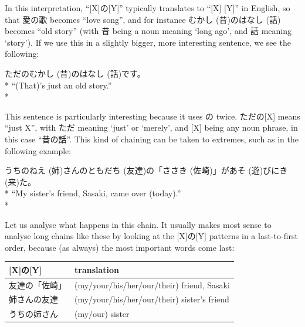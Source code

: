 \documentclass[11pt, b5paper, twoside, openright, onecolumn]{book}
\makeatletter
\newcommand*{\rubystack}[2]{{\relscale{0.5}%
  \begin{tabular}[b]{@{}c@{}}%
    {#1}\\%
   {\textscale{2}{#2}}%
  \end{tabular}}%
}
\DeclareRobustCommand*{\ruby}[2]{%
  \mbox{%
    \setlength{\parskip}{0ex}%
    \BeginAccSupp{method=pdfstringdef,ActualText={#1}}%
      \rubystack{\phantom{#2}}{#1}%
      \llap{%
        \rubystack{#2}{\phantom{#1}}%
      }%
    \EndAccSupp{}%
  }%
}
\renewcommand*{\ruby}[2]{#2 (#1)}%
\newenvironment{exampleblock}{
\setlength{\parindent}{0.6in}
\begin{minipage}[t]{\dimexpr\textwidth-\parindent}}
{\end{minipage}}
\newenvironment{mytabular}[1]{\noindent\hspace{0.4in}
\begin{tabular}[h]{#1}}{\end{tabular}}
\makeatother
\begin{document}
In this interpretation‚ “[X]の[Y]” typically translates to “[X] [Y]” in English‚ so that 愛の歌 becomes “love song”‚ and for instance \ruby{昔}{むかし}の\ruby{話}{はなし} becomes “old story” (with 昔 being a noun meaning ‘long ago’‚  and 話 meaning ‘story’). If we use this in a slightly bigger‚ more interesting sentence‚ we see the following:

\vspace{0.4cm}
\begin{exampleblock}
ただの\ruby{昔}{むかし}の\ruby{話}{はなし}です。 \\* 
“(That)’s just an old story.” \\* 
\end{exampleblock}
\vspace{0.2cm}

This sentence is particularly interesting because it uses の twice. ただの[X] means “just X”‚ with ただ meaning ‘just’ or ‘merely’‚ and [X] being any noun phrase‚ in this case “昔の話”. This kind of chaining can be taken to extremes‚ such as in the following example:

\vspace{0.4cm}
\begin{exampleblock}
うちの\ruby{姉}{ねえ}さんの\ruby{友達}{ともだち}の「\ruby{佐崎}{ささき}」が\ruby{遊}{あそ}びに\ruby{来}{き}た。 \\* 
“My sister’s friend‚ Sasaki‚ came over (today).” \\* 
\end{exampleblock}
\vspace{0.2cm}

Let us analyse what happens in this chain. It usually makes most sense to analyse long chains like these by looking at the [X]の[Y] patterns in a last-to-first order‚ because (as always) the most important words come last:

\vspace{0.5cm}
\smaller
\begin{mytabular}{| l  l |}\hline 
\rule{0pt}{2.4ex}[X]の[Y] & translation\\ 
\hline
\rule{0pt}{2.4ex}友達の「佐崎」 & (my/your/his/her/our/their) friend‚ Sasaki\\ 
\rule{0pt}{2.4ex}姉さんの友達 & (my/your/his/her/our/their) sister’s friend\\ 
\rule{0pt}{2.4ex}うちの姉さん & (my/our) sister\\ 
\hline 
\end{mytabular}
\larger
\vspace{0.5cm}
\end{document}
